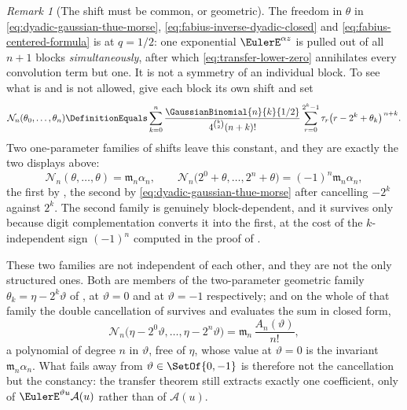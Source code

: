 \documentclass[11pt,a4paper,oneside,openany]{book}
\theoremstyle{definition}
\theoremstyle{remark}
\newtheorem{remark}[remark]{Remark}
\begin{document}
\begin{remark}[The shift must be common, or geometric]\label{rem:dyadic-shift-common}
The freedom in $\theta$ in \eqref{eq:dyadic-gaussian-thue-morse},
\eqref{eq:fabius-inverse-dyadic-closed} and \eqref{eq:fabius-centered-formula}
is  at $q=1/2$: one exponential $\EulerE^{\alpha z}$ is
pulled out of all $n+1$ blocks \emph{simultaneously}, after which
\eqref{eq:transfer-lower-zero} annihilates every convolution term but one.  It is
not a symmetry of an individual block.  To see what is and is not allowed, give
each block its own shift and set
\begin{equation}\label{eq:dyadic-numerator-blockwise}
 \mathcal N_n(\theta_0,\ldots,\theta_n)
 \DefinitionEquals\sum_{k=0}^{n}
 \frac{\GaussianBinomial{n}{k}{1/2}}{4^{\binom k2}(n+k)!}
 \sum_{r=0}^{2^k-1}\tau_r\bigl(r-2^k+\theta_k\bigr)^{\,n+k}.
\end{equation}
Two one-parameter families of shifts leave this constant, and they are exactly
the two displays above:
\[
 \mathcal N_n(\theta,\ldots,\theta)=\mathfrak m_n\alpha_n,
 \qquad
 \mathcal N_n\bigl(2^0+\theta,\ldots,2^n+\theta\bigr)
 =(-1)^n\mathfrak m_n\alpha_n ,
\]
the first by , the second by
\eqref{eq:dyadic-gaussian-thue-morse} after cancelling $-2^k$ against $2^k$.  The
second family is genuinely block-dependent, and it survives only because digit
complementation converts it into the first, at the cost of the $k$-independent
sign $(-1)^n$ computed in the proof of .

These two families are not independent of each other, and they are not the only
structured ones.  Both are members of the two-parameter geometric family
$\theta_k=\eta-2^k\vartheta$ of ,
at $\vartheta=0$ and at $\vartheta=-1$ respectively; and on the whole of that
family the double cancellation of  survives and
evaluates the sum in closed form,
\[
 \mathcal N_n\bigl(\eta-2^0\vartheta,\ldots,\eta-2^n\vartheta\bigr)
 =\mathfrak m_n\,\frac{A_n(\vartheta)}{n!},
\]
a polynomial of degree $n$ in $\vartheta$, free of $\eta$, whose value at
$\vartheta=0$ is the invariant $\mathfrak m_n\alpha_n$.  What fails away from
$\vartheta\in\SetOf{0,-1}$ is therefore not the cancellation but the constancy: the
transfer theorem still extracts exactly one coefficient, only of
$\EulerE^{\vartheta u}\mathcal A(u)$ rather than of $\mathcal A(u)$.


\end{remark}
\end{document}
